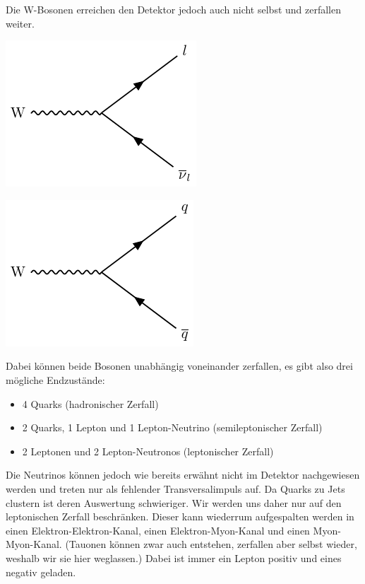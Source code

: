 Die W-Bosonen erreichen den Detektor jedoch auch nicht selbst und zerfallen weiter.
\begin{center}
\begin{minipage}[t]{0.45\textwidth}
\includegraphics{../Pictures/generate_feynman_Wlnu/Wlnu-feynman.pdf}
\label{Wlnu}
\end{minipage} \quad
\begin{minipage}[t]{0.45\textwidth}
\includegraphics{../Pictures/generate_feynman_Wqq/Wqq-feynman.pdf}
\label{Wqq}
\end{minipage}
\end{center}
Dabei können beide Bosonen unabhängig voneinander zerfallen, es gibt also drei mögliche Endzustände:
\begin{itemize}
\item 4 Quarks (\glqq hadronischer Zerfall\grqq{})
\item 2 Quarks, 1 Lepton und 1 Lepton-Neutrino (\glqq semileptonischer Zerfall\grqq{})
\item 2 Leptonen und 2 Lepton-Neutronos (\glqq leptonischer Zerfall\grqq{})
\end{itemize}
Die Neutrinos können jedoch wie bereits erwähnt nicht im Detektor nachgewiesen werden und treten nur als fehlender Transversalimpuls auf.
Da Quarks zu Jets clustern ist deren Auswertung schwieriger.
Wir werden uns daher nur auf den leptonischen Zerfall beschränken.
Dieser kann wiederrum aufgespalten werden in einen Elektron-Elektron-Kanal, einen Elektron-Myon-Kanal und einen Myon-Myon-Kanal.
(Tauonen können zwar auch entstehen, zerfallen aber selbst wieder, weshalb wir sie hier weglassen.)
Dabei ist immer ein Lepton positiv und eines negativ geladen.

